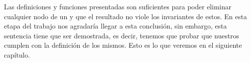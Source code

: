 Las definiciones y funciones presentadas son suficientes para poder eliminar cualquier nodo de un {\arn} y que el
resultado no viole los invariantes de estos. En esta etapa del trabajo nos agradar\'ia llegar a esta 
conclusi\'on, sin embargo, esta sentencia tiene que ser demostrada, es decir, tenemos que
probar que nuestros {\arns} cumplen con la  definici\'on de los mismos.
Esto es lo que veremos en el siguiente cap\'itulo.

